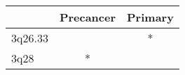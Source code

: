\begin{tabular}{lcc}
\toprule
{} & Precancer & Primary \\
\midrule
3q26.33 &           &       * \\
3q28    &         * &         \\
\bottomrule
\end{tabular}
